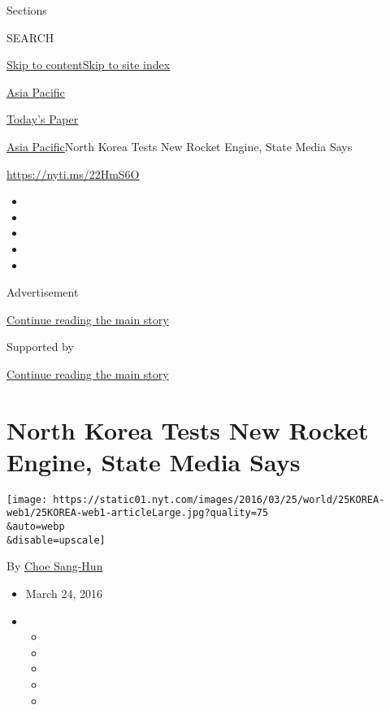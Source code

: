 Sections

SEARCH

\protect\hyperlink{site-content}{Skip to
content}\protect\hyperlink{site-index}{Skip to site index}

\href{https://www.nytimes.com/section/world/asia}{Asia Pacific}

\href{https://myaccount.nytimes.com/auth/login?response_type=cookie\&client_id=vi}{}

\href{https://www.nytimes.com/section/todayspaper}{Today's Paper}

\href{/section/world/asia}{Asia Pacific}\textbar{}North Korea Tests New
Rocket Engine, State Media Says

\url{https://nyti.ms/22HmS6O}

\begin{itemize}
\item
\item
\item
\item
\item
\end{itemize}

Advertisement

\protect\hyperlink{after-top}{Continue reading the main story}

Supported by

\protect\hyperlink{after-sponsor}{Continue reading the main story}

\hypertarget{north-korea-tests-new-rocket-engine-state-media-says}{%
\section{North Korea Tests New Rocket Engine, State Media
Says}\label{north-korea-tests-new-rocket-engine-state-media-says}}

\texttt{[image: https://static01.nyt.com/images/2016/03/25/world/25KOREA-web1/25KOREA-web1-articleLarge.jpg?quality=75\\\&auto=webp\\\&disable=upscale]}

By \href{http://www.nytimes.com/by/choe-sang-hun}{Choe Sang-Hun}

\begin{itemize}
\item
  March 24, 2016
\item
  \begin{itemize}
  \item
  \item
  \item
  \item
  \item
  \end{itemize}
\end{itemize}

